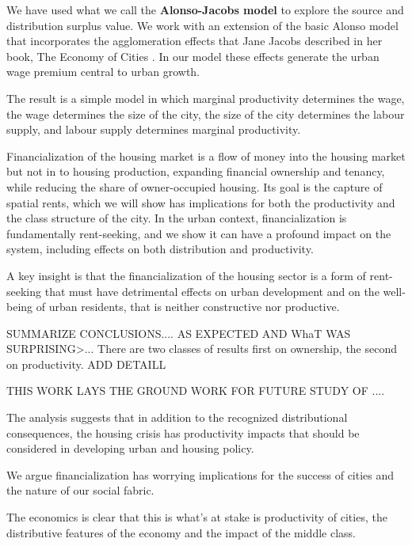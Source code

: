 We have used what we call the  \textbf{\gls{Alonso-Jacobs model}} to explore the source and distribution surplus value. We  work with an extension of the basic Alonso model that incorporates the \glspl{agglomeration effect} that Jane Jacobs  described in her book, The Economy of Cities \cite{jacobsEconomyCities1969}. In our model these effects generate the \gls{urban wage premium} central to urban growth. %

The result is a simple model in which marginal productivity determines the wage, the wage determines the size of the city, the size of the city determines the labour supply, and labour supply determines marginal productivity. 


Financialization of the housing market is a flow of money into the housing market but not in to housing production, expanding financial ownership and tenancy, while reducing the share of owner-occupied housing. Its goal is the capture of spatial rents, which we will show has implications for both the productivity and the class structure of the city. 
In the urban context, financialization is fundamentally \gls{rent-seeking}, and we show it can have a profound impact on the system, including effects on both distribution and productivity. 

A key insight is that the financialization of the housing sector is a form of \gls{rent-seeking} that must have detrimental effects on urban development and on the well-being of urban residents, that is neither constructive nor productive.

SUMMARIZE CONCLUSIONS.... AS EXPECTED AND WhaT WAS SURPRISING>...
There are two classes of results first on ownership, the second on productivity. ADD DETAILL

THIS WORK LAYS THE GROUND WORK FOR FUTURE STUDY OF ....

The analysis suggests that in addition to the recognized distributional consequences, the housing crisis has productivity impacts that should be considered in developing urban and housing policy. 


We argue financialization %
has worrying implications for the success of cities and the nature of our social fabric. 

The economics is clear that this is what's at stake is productivity of cities, the distributive features of the economy and the impact of the middle class. 


